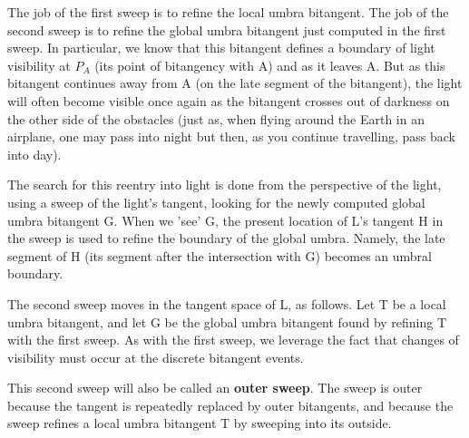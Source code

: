 \documentclass[12pt]{article}
\begin{document}
The job of the first sweep is to refine the local umbra bitangent.
The job of the second sweep is to refine the global umbra bitangent
just computed in the first sweep.
In particular, we know that this bitangent defines a boundary of light
visibility at $P_A$ (its point of bitangency with A) and as it leaves A.
But as this bitangent continues away from A (on the late segment of the
bitangent), the light will often become visible once again as the bitangent
crosses out of darkness on the other side of the obstacles
(just as, when flying around the Earth in an airplane, one may pass into night
but then, as you continue travelling, pass back into day).

The search for this reentry into light is done from the perspective of the 
light, using a sweep of the light's tangent, looking for the newly
computed global umbra bitangent G.
When we 'see' G, the present location of L's tangent H in the sweep is used
to refine the boundary of the global umbra.
Namely, the late segment of H (its segment after the intersection with G)
becomes an umbral boundary.

The second sweep moves in the tangent space of L, as follows.
Let T be a local umbra bitangent, and let G be the global umbra bitangent
found by refining T with the first sweep.
As with the first sweep, we leverage the fact that changes of visibility
must occur at the discrete bitangent events.

\begin{defn2}
This second sweep will also be called an {\bf outer sweep}.
The sweep is outer because the tangent is repeatedly replaced by outer
bitangents, and because the sweep refines a local umbra bitangent T
by sweeping into its outside.
\end{defn2}
\end{document}
